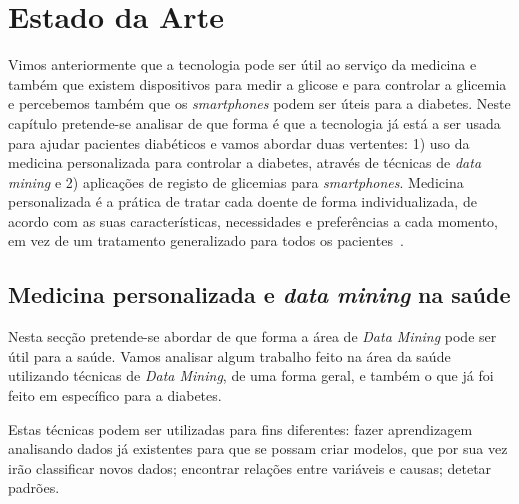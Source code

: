 \chapter{Estado da Arte}\label{chap:stat}

Vimos anteriormente que a tecnologia pode ser útil ao serviço da medicina e também que existem dispositivos para medir a glicose e para controlar a glicemia e percebemos também que os \textit{smartphones} podem ser úteis para a diabetes. Neste capítulo pretende-se analisar de que forma é que a tecnologia já está a ser usada para ajudar pacientes diabéticos e vamos abordar duas vertentes: 1) uso da medicina personalizada para controlar a diabetes, através de técnicas de \textit{data mining} e 2) aplicações de registo de glicemias para \textit{smartphones}.
Medicina personalizada é a prática de tratar cada doente de forma individualizada, de acordo com as suas características, necessidades e preferências a cada momento, em vez de um tratamento generalizado para todos os pacientes~\cite{personalized}.

\section{Medicina personalizada e \textit{data mining} na saúde}


Nesta secção pretende-se abordar de que forma a área de \textit{Data Mining} pode ser útil para a saúde. Vamos analisar algum trabalho feito na área da saúde utilizando técnicas de \textit{Data Mining}, de uma forma geral, e também o que já foi feito em específico para a diabetes. 

Estas técnicas podem ser utilizadas para fins diferentes: fazer aprendizagem analisando dados já existentes para que se possam criar modelos, que por sua vez irão classificar novos dados; encontrar relações entre variáveis e causas; detetar padrões.


